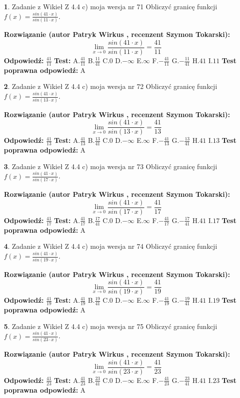 \documentclass[12pt, a4paper]{article}
\theoremstyle{definition} %
\newtheorem{zad}{}
\newcommand{\zadStart}[1]{\begin{zad}#1\newline}
\newcommand{\zadStop}{\end{zad}}
\newcommand{\rozwStart}[2]{\noindent \textbf{Rozwiązanie (autor #1 , recenzent #2): }\newline}
\newcommand{\rozwStop}{\newline}
\newcommand{\odpStart}{\noindent \textbf{Odpowiedź:}\newline}
\newcommand{\odpStop}{\newline}
\newcommand{\testStart}{\noindent \textbf{Test:}\newline}
\newcommand{\testStop}{\newline}
\newcommand{\kluczStart}{\noindent \textbf{Test poprawna odpowiedź:}\newline}
\newcommand{\kluczStop}{\newline}
\begin{document}
\zadStart{Zadanie z Wikieł Z 4.4 c) moja wersja nr 71}
Obliczyć granicę funkcji $f(x)=\frac{sin(41\cdot x)}{sin(11\cdot x)}$.
\zadStop
\rozwStart{Patryk Wirkus}{Szymon Tokarski}
$$\lim\limits_{x\to 0}\frac{sin(41\cdot x)}{sin(11\cdot x)}=
\frac{41}{11}$$
\rozwStop
\odpStart
$\frac{41}{11}$
\odpStop
\testStart
A.$\frac{41}{11}$
B.$\frac{11}{41}$
C.$0$
D.$-\infty$
E.$\infty$
F.$-\frac{41}{11}$
G.$-\frac{11}{41}$
H.$41$
I.$11$
\testStop
\kluczStart
A
\kluczStop



\zadStart{Zadanie z Wikieł Z 4.4 c) moja wersja nr 72}
Obliczyć granicę funkcji $f(x)=\frac{sin(41\cdot x)}{sin(13\cdot x)}$.
\zadStop
\rozwStart{Patryk Wirkus}{Szymon Tokarski}
$$\lim\limits_{x\to 0}\frac{sin(41\cdot x)}{sin(13\cdot x)}=
\frac{41}{13}$$
\rozwStop
\odpStart
$\frac{41}{13}$
\odpStop
\testStart
A.$\frac{41}{13}$
B.$\frac{13}{41}$
C.$0$
D.$-\infty$
E.$\infty$
F.$-\frac{41}{13}$
G.$-\frac{13}{41}$
H.$41$
I.$13$
\testStop
\kluczStart
A
\kluczStop



\zadStart{Zadanie z Wikieł Z 4.4 c) moja wersja nr 73}
Obliczyć granicę funkcji $f(x)=\frac{sin(41\cdot x)}{sin(17\cdot x)}$.
\zadStop
\rozwStart{Patryk Wirkus}{Szymon Tokarski}
$$\lim\limits_{x\to 0}\frac{sin(41\cdot x)}{sin(17\cdot x)}=
\frac{41}{17}$$
\rozwStop
\odpStart
$\frac{41}{17}$
\odpStop
\testStart
A.$\frac{41}{17}$
B.$\frac{17}{41}$
C.$0$
D.$-\infty$
E.$\infty$
F.$-\frac{41}{17}$
G.$-\frac{17}{41}$
H.$41$
I.$17$
\testStop
\kluczStart
A
\kluczStop



\zadStart{Zadanie z Wikieł Z 4.4 c) moja wersja nr 74}
Obliczyć granicę funkcji $f(x)=\frac{sin(41\cdot x)}{sin(19\cdot x)}$.
\zadStop
\rozwStart{Patryk Wirkus}{Szymon Tokarski}
$$\lim\limits_{x\to 0}\frac{sin(41\cdot x)}{sin(19\cdot x)}=
\frac{41}{19}$$
\rozwStop
\odpStart
$\frac{41}{19}$
\odpStop
\testStart
A.$\frac{41}{19}$
B.$\frac{19}{41}$
C.$0$
D.$-\infty$
E.$\infty$
F.$-\frac{41}{19}$
G.$-\frac{19}{41}$
H.$41$
I.$19$
\testStop
\kluczStart
A
\kluczStop



\zadStart{Zadanie z Wikieł Z 4.4 c) moja wersja nr 75}
Obliczyć granicę funkcji $f(x)=\frac{sin(41\cdot x)}{sin(23\cdot x)}$.
\zadStop
\rozwStart{Patryk Wirkus}{Szymon Tokarski}
$$\lim\limits_{x\to 0}\frac{sin(41\cdot x)}{sin(23\cdot x)}=
\frac{41}{23}$$
\rozwStop
\odpStart
$\frac{41}{23}$
\odpStop
\testStart
A.$\frac{41}{23}$
B.$\frac{23}{41}$
C.$0$
D.$-\infty$
E.$\infty$
F.$-\frac{41}{23}$
G.$-\frac{23}{41}$
H.$41$
I.$23$
\testStop
\kluczStart
A
\kluczStop
\end{document}
